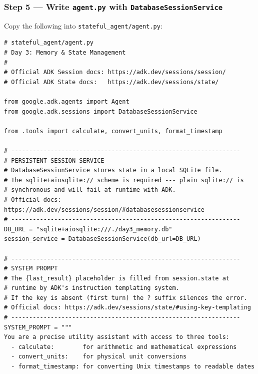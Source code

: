 \documentclass[12pt, a4paper]{article}
\begin{document}
\begin{practicalbox}
\subsubsection*{Step 5 --- Write \texttt{agent.py} with \texttt{DatabaseSessionService}}

%

Copy the following into \texttt{stateful\_agent/agent.py}:

\begin{lstlisting}[style=pythonstyle, caption={stateful\_agent/agent.py --- stateful agent with DatabaseSessionService}]
# stateful_agent/agent.py
# Day 3: Memory & State Management
#
# Official ADK Session docs: https://adk.dev/sessions/session/
# Official ADK State docs:   https://adk.dev/sessions/state/

from google.adk.agents import Agent
from google.adk.sessions import DatabaseSessionService

from .tools import calculate, convert_units, format_timestamp

# ----------------------------------------------------------------
# PERSISTENT SESSION SERVICE
# DatabaseSessionService stores state in a local SQLite file.
# The sqlite+aiosqlite:// scheme is required --- plain sqlite:// is
# synchronous and will fail at runtime with ADK.
# Official docs: https://adk.dev/sessions/session/#databasesessionservice
# ----------------------------------------------------------------
DB_URL = "sqlite+aiosqlite:///./day3_memory.db"
session_service = DatabaseSessionService(db_url=DB_URL)

# ----------------------------------------------------------------
# SYSTEM PROMPT
# The {last_result} placeholder is filled from session.state at
# runtime by ADK's instruction templating system.
# If the key is absent (first turn) the ? suffix silences the error.
# Official docs: https://adk.dev/sessions/state/#using-key-templating
# ----------------------------------------------------------------
SYSTEM_PROMPT = """
You are a precise utility assistant with access to three tools:
  - calculate:        for arithmetic and mathematical expressions
  - convert_units:    for physical unit conversions
  - format_timestamp: for converting Unix timestamps to readable dates


\end{lstlisting}
\end{practicalbox}
\end{document}
